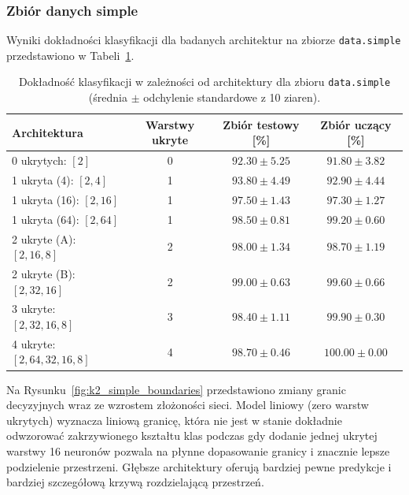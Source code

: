 \documentclass[11pt,a4paper]{article}
\begin{document}
\subsubsection{Zbiór danych simple}

Wyniki dokładności klasyfikacji dla badanych architektur na zbiorze \texttt{data.simple} przedstawiono w Tabeli~\ref{tab:k2_accuracy_simple}.

\begin{table}[H]
    \centering
    \setlength{\tabcolsep}{5pt}
    \caption{Dokładność klasyfikacji w zależności od architektury dla zbioru \texttt{data.simple} (średnia $\pm$ odchylenie standardowe z 10 ziaren).}
    \label{tab:k2_accuracy_simple}
    \begin{tabular}{lccc}
        \toprule
        \textbf{Architektura} & \textbf{Warstwy ukryte} & \textbf{Zbiór testowy [\%]} & \textbf{Zbiór uczący [\%]} \\
        \midrule
        0 ukrytych: $[2]$                  & 0 & $92.30 \pm 5.25$ & $91.80 \pm 3.82$ \\
        1 ukryta (4): $[2, 4]$             & 1 & $93.80 \pm 4.49$ & $92.90 \pm 4.44$ \\
        1 ukryta (16): $[2, 16]$           & 1 & $97.50 \pm 1.43$ & $97.30 \pm 1.27$ \\
        1 ukryta (64): $[2, 64]$           & 1 & $98.50 \pm 0.81$ & $99.20 \pm 0.60$ \\
        2 ukryte (A): $[2, 16, 8]$         & 2 & $98.00 \pm 1.34$ & $98.70 \pm 1.19$ \\
        2 ukryte (B): $[2, 32, 16]$        & 2 & $\mathbf{99.00 \pm 0.63}$ & $99.60 \pm 0.66$ \\
        3 ukryte: $[2, 32, 16, 8]$         & 3 & $98.40 \pm 1.11$ & $99.90 \pm 0.30$ \\
        4 ukryte: $[2, 64, 32, 16, 8]$     & 4 & $98.70 \pm 0.46$ & $100.00 \pm 0.00$ \\
        \bottomrule
    \end{tabular}
\end{table}

Na Rysunku~\ref{fig:k2_simple_boundaries} przedstawiono zmiany granic decyzyjnych wraz ze wzrostem złożoności sieci.
Model liniowy (zero warstw ukrytych) wyznacza liniową granicę, która nie jest w stanie dokładnie odwzorować zakrzywionego kształtu klas
podczas gdy dodanie jednej ukrytej warstwy 16 neuronów pozwala na płynne dopasowanie granicy i znacznie lepsze podzielenie przestrzeni.
Głębsze architektury oferują bardziej pewne predykcje i bardziej szczegółową krzywą rozdzielającą przestrzeń.
\end{document}
